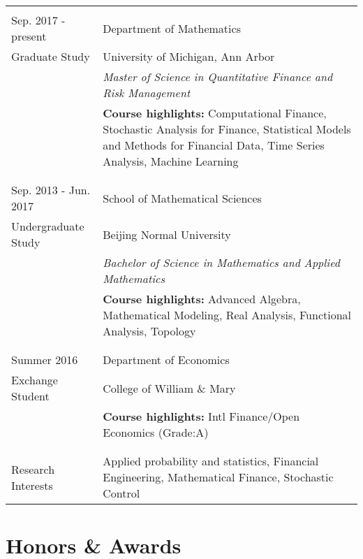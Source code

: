 \documentclass[a4paper,11pt]{article} %
\begin{document}
\begin{tabular}{p{4cm}|p{11cm}}

\multicolumn{2}{c}{}\\
Sep. 2017 - present  & Department of Mathematics\\
Graduate Study & University of Michigan, Ann Arbor\\
& \emph{Master of Science in Quantitative Finance and Risk Management}\\
& {\bf Course highlights:}  Computational Finance, Stochastic Analysis for Finance, Statistical Models and Methods for Financial Data, Time Series Analysis, Machine Learning\\
\multicolumn{2}{c}{}\\

\multicolumn{2}{c}{}\\
Sep. 2013 - Jun. 2017 & School of Mathematical Sciences\\
Undergraduate Study & Beijing Normal University\\
& \emph{Bachelor of Science in Mathematics and Applied Mathematics}\\
& {\bf Course highlights:}  Advanced Algebra, Mathematical Modeling, Real Analysis, Functional Analysis, Topology\\
\multicolumn{2}{c}{}\\

\multicolumn{2}{c}{}\\
Summer 2016  & Department of Economics\\
Exchange Student & College of William \& Mary\\
& {\bf Course highlights:}  Intl Finance/Open Economics (Grade:A)\\
\multicolumn{2}{c}{}\\

\multicolumn{2}{c}{}\\
Research Interests &Applied probability and statistics, Financial Engineering, Mathematical Finance, Stochastic Control\\

\end{tabular}

\section{ Honors \& Awards }
\end{document}
